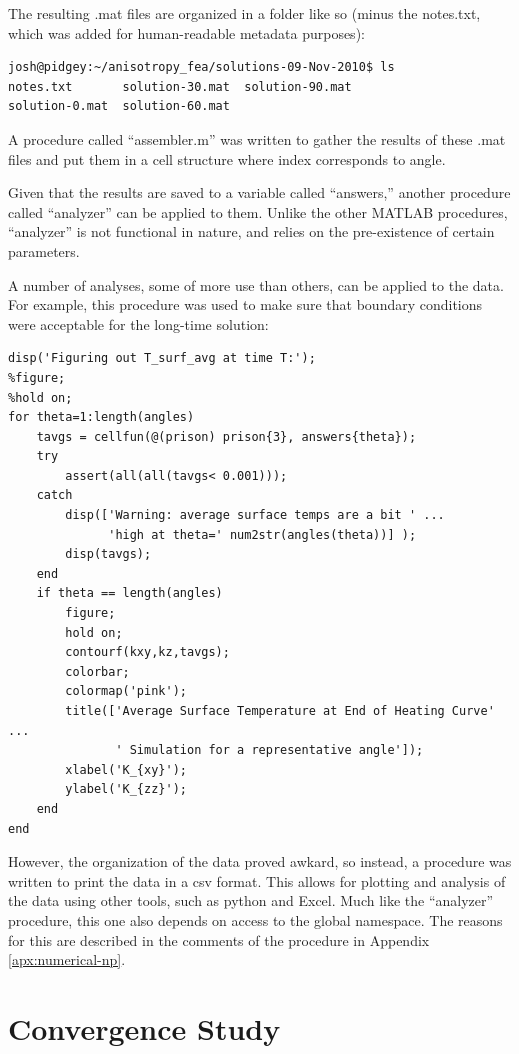 The resulting .mat files are organized in a folder like so (minus the
notes.txt, which was added for human-readable metadata purposes):

\small
\begin{verbatim}
josh@pidgey:~/anisotropy_fea/solutions-09-Nov-2010$ ls
notes.txt       solution-30.mat  solution-90.mat
solution-0.mat  solution-60.mat

\end{verbatim}
\normalsize

A procedure called ``assembler.m'' was written to gather the results of these
.mat files and put them in a cell structure where index corresponds to
angle.

Given that the results are saved to a variable called ``answers,'' another
procedure called ``analyzer'' can be applied to them.  Unlike the other
MATLAB procedures, ``analyzer'' is not functional in nature, and relies on
the pre-existence of certain parameters.

A number of analyses, some of more use than others, can be applied to the
data. For example, this procedure was used to make sure that boundary conditions
were acceptable for the long-time solution:


\small
\begin{verbatim}
disp('Figuring out T_surf_avg at time T:');
%figure;
%hold on;
for theta=1:length(angles)
    tavgs = cellfun(@(prison) prison{3}, answers{theta});
    try
        assert(all(all(tavgs< 0.001)));
    catch
        disp(['Warning: average surface temps are a bit ' ...
              'high at theta=' num2str(angles(theta))] );
        disp(tavgs);
    end
    if theta == length(angles)
        figure;
        hold on;
        contourf(kxy,kz,tavgs);
        colorbar;
        colormap('pink');
        title(['Average Surface Temperature at End of Heating Curve' ...
               ' Simulation for a representative angle']);
        xlabel('K_{xy}');
        ylabel('K_{zz}');
    end
end
\end{verbatim}
\normalsize

However, the organization of the data proved awkard, so instead, a procedure was
written to print the data in a csv format. This allows for plotting and
analysis of the data using other tools, such as python and Excel. Much like the
``analyzer'' procedure, this one also depends on access to the global namespace.
The reasons for this are described in the comments of the procedure in Appendix \ref{apx:numerical-np}.

\section{Convergence Study}

